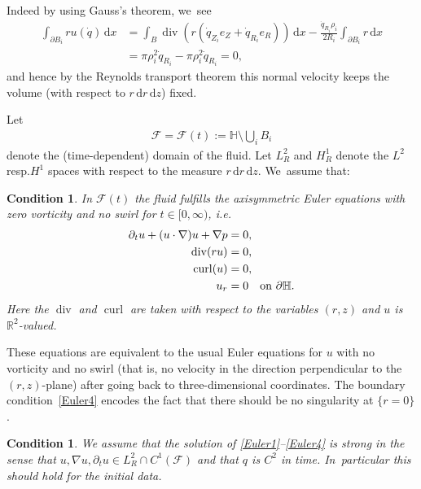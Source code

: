 \documentclass[10pt]{amsart}
\newcommand{\resp}{resp.}
\newcommand{\ie}{i.e.}
\let\backslash\setminus
\newtheorem{condition}[theorem]{Condition}
\theoremstyle{definition}
\renewcommand{\div}{\operatorname{div}}
\DeclareMathOperator{\curl}{curl}
\newcommand\R{\mathbb{R}}
\newcommand\eq{=}
\newcommand\dd{\,\mathrm{d}}
\newcommand\dx{\dd x}
\newcommand\dz{\dd z}
\newcommand\dr{\dd r}
\let\de\partial
\begin{document}
Indeed by using Gauss's theorem, we~see
\begin{equation}
\begin{aligned}
\int_{\de B_i}ru(\dot{q})\dx&=\int_B \div\left(r(\dot{q}_{Z_i}e_Z+\dot{q}_{R_i}e_R)\right)\dx-\frac{\dot{q}_{R_i}\rho_i}{2R_i}\int_{\de B_i} r\dx\\
&=\pi\rho_i^2\dot{q}_{R_i}-\pi \rho_i^2\dot{q}_{R_i}=0,\label{vol fix}
\end{aligned}
\end{equation}
and hence by the Reynolds transport theorem this normal velocity keeps the volume (with respect to $r\dr\dz$) fixed.

Let
\begin{align*}
\mathcal{F}=\mathcal{F}(t):=\mathbb{H}\backslash \bigcup_i B_i
\end{align*}
denote the (time-dependent) domain of the fluid. Let $L_R^2$ and $H_R^1$ denote the $L^2$ \resp $H^1$ spaces with respect to the measure $r\dr\dz$. We~assume that:

\begin{condition}
In $\mathcal{F}(t)$ the fluid fulfills the axisymmetric Euler equations with zero vorticity and no swirl for $t\in [0,\infty)$, \ie
\begin{align}
\de_t u+(u\cdot\nabla)u+\nabla p&\eq 0,\label{Euler1}\\
\div(ru)&\eq 0,\label{Euler2}\\
\curl(u)&\eq 0,\label{Euler3}\\
u_r&\eq 0 \quad\text{\normalfont{on} $\de \mathbb{H}$.}\label{Euler4}
\end{align}
Here the $\div$ and $\curl$ are taken with respect to the variables $(r,z)$ and $u$ is $\R^2$-valued.
\end{condition}

These equations are equivalent to the usual Euler equations for $u$ with no vorticity and no swirl (that is, no velocity in the direction perpendicular to the $(r,z)$-plane) after going back to three-dimensional coordinates. The boundary condition~\eqref{Euler4} encodes the fact that there should be no singularity at $\{r=0\}$.

\begin{condition}\label{strongsol}
We assume that the solution of \eqref{Euler1}--\eqref{Euler4} is strong in the sense that $u,\nabla u,\de_t u\in L_R^2\cap C^1(\mathcal{F})$ and that $q$ is $C^2$ in time. In~particular this should hold for the initial data.
\end{condition}
\end{document}
